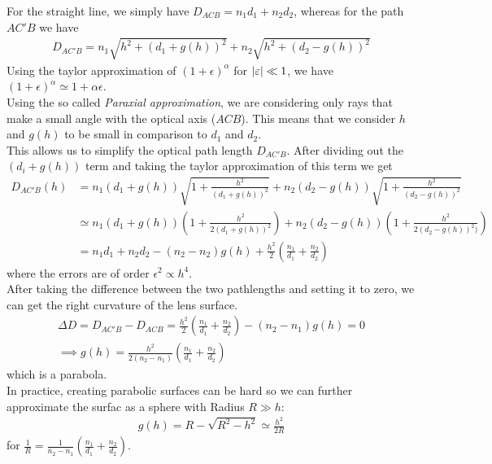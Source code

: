 For the straight line, we simply have $D_{ACB} = n_1d_1 + n_2d_2$, whereas for the path $AC'B$ we have
\begin{align*}
				D_{AC'B} = n_1 \sqrt{h^2 + (d_1 + g(h))^2} + n_2 \sqrt{h^2 + (d_2 - g(h))^2}
\end{align*}
Using the taylor approximation of $(1 + \epsilon)^{\alpha}$ for $\vert\varepsilon\vert \ll 1$, we have $(1 + \epsilon)^{\alpha} \simeq 1 + \alpha \epsilon$.\\
Using the so called \emph{Paraxial approximation}, we are considering only rays that make a small angle with the optical axis ($ACB$). This means that we consider $h$ and $g(h)$ to be small in comparison to $d_1$ and $d_2$.\\
This allows us to simplify the optical path length $D_{AC'B}$. After dividing out the $(d_i + g(h))$ term and taking the taylor approximation of this term we get
\begin{align*}
				D_{AC'B}(h) &= n_1(d_1 + g(h)) \sqrt{1 + \frac{h^2}{(d_1 + g(h))^{2}}} + n_2(d_2 - g(h)) \sqrt{1 + \frac{h^2}{(d_2 - g(h))^{2}}}\\
										&\simeq n_1(d_1 + g(h)) \left(1 + \frac{h^2}{2(d_1 + g(h))^{2}}\right) + n_2(d_2 - g(h)) \left(1 + \frac{h^2}{2(d_2 - g(h))^{2})}\right)\\
										&= n_1d_1 + n_2d_2 - (n_2-n_2)g(h) + \frac{h^2}{2} \left(\frac{n_1}{d_1} + \frac{n_2}{d_2}\right)
\end{align*}
where the errors are of order $\epsilon^2 \propto h^4$.\\
After taking the difference between the two pathlengths and setting it to zero, we can get the right curvature of the lens surface.
\begin{align*}
				\Delta D = D_{AC'B} - D_{ACB} = \frac{h^2}{2} \left(\frac{n_1}{d_1} + \frac{n_2}{d_2}\right) - (n_2 - n_1) g(h) = 0\\
				\implies g(h) = \frac{h^2}{2(n_2 - n_1)} \left(\frac{n_1}{d_1} + \frac{n_2}{d_2}\right)
\end{align*}
which is a parabola.\\
In practice, creating parabolic surfaces can be hard so we can further approximate the surfac as a sphere with Radius $R \gg h$:
\begin{align*}
				g(h) = R - \sqrt{R^2 - h^2} \simeq \frac{h^2}{2R}
\end{align*}
for $\frac{1}{R} = \frac{1}{n_2 - n_1} \left(\frac{n_1}{d_1} + \frac{n_2}{d_2}\right)$.\\

